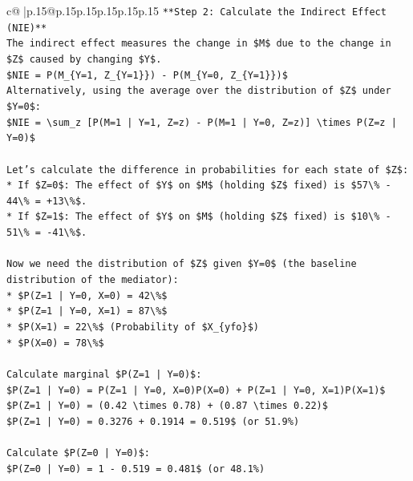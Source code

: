 \documentclass{article}
\begin{document}
{\begin{supertabular}{c@{$\;$}|p{.15\linewidth}@{}p{.15\linewidth}p{.15\linewidth}p{.15\linewidth}p{.15\linewidth}p{.15\linewidth}}
{{{\texttt{**Step 2: Calculate the Indirect Effect (NIE)**} \\
\texttt{The indirect effect measures the change in \$M\$ due to the change in \$Z\$ caused by changing \$Y\$.} \\
\texttt{\$NIE = P(M\_\{Y=1, Z\_\{Y=1\}\}) {-} P(M\_\{Y=0, Z\_\{Y=1\}\})\$} \\
\texttt{Alternatively, using the average over the distribution of \$Z\$ under \$Y=0\$:} \\
\texttt{\$NIE = \textbackslash{}sum\_z {[}P(M=1 | Y=1, Z=z) {-} P(M=1 | Y=0, Z=z){]} \textbackslash{}times P(Z=z | Y=0)\$} \\
\\ 
\texttt{Let's calculate the difference in probabilities for each state of \$Z\$:} \\
\texttt{*   If \$Z=0\$: The effect of \$Y\$ on \$M\$ (holding \$Z\$ fixed) is \$57\textbackslash{}\% {-} 44\textbackslash{}\% = +13\textbackslash{}\%\$.} \\
\texttt{*   If \$Z=1\$: The effect of \$Y\$ on \$M\$ (holding \$Z\$ fixed) is \$10\textbackslash{}\% {-} 51\textbackslash{}\% = {-}41\textbackslash{}\%\$.} \\
\\ 
\texttt{Now we need the distribution of \$Z\$ given \$Y=0\$ (the baseline distribution of the mediator):} \\
\texttt{*   \$P(Z=1 | Y=0, X=0) = 42\textbackslash{}\%\$} \\
\texttt{*   \$P(Z=1 | Y=0, X=1) = 87\textbackslash{}\%\$} \\
\texttt{*   \$P(X=1) = 22\textbackslash{}\%\$ (Probability of \$X\_\{yfo\}\$)} \\
\texttt{*   \$P(X=0) = 78\textbackslash{}\%\$} \\
\\ 
\texttt{Calculate marginal \$P(Z=1 | Y=0)\$:} \\
\texttt{\$P(Z=1 | Y=0) = P(Z=1 | Y=0, X=0)P(X=0) + P(Z=1 | Y=0, X=1)P(X=1)\$} \\
\texttt{\$P(Z=1 | Y=0) = (0.42 \textbackslash{}times 0.78) + (0.87 \textbackslash{}times 0.22)\$} \\
\texttt{\$P(Z=1 | Y=0) = 0.3276 + 0.1914 = 0.519\$ (or 51.9\%)} \\
\\ 
\texttt{Calculate \$P(Z=0 | Y=0)\$:} \\
\texttt{\$P(Z=0 | Y=0) = 1 {-} 0.519 = 0.481\$ (or 48.1\%)} \\
\\ 
}}}
\end{supertabular}}
\end{document}
